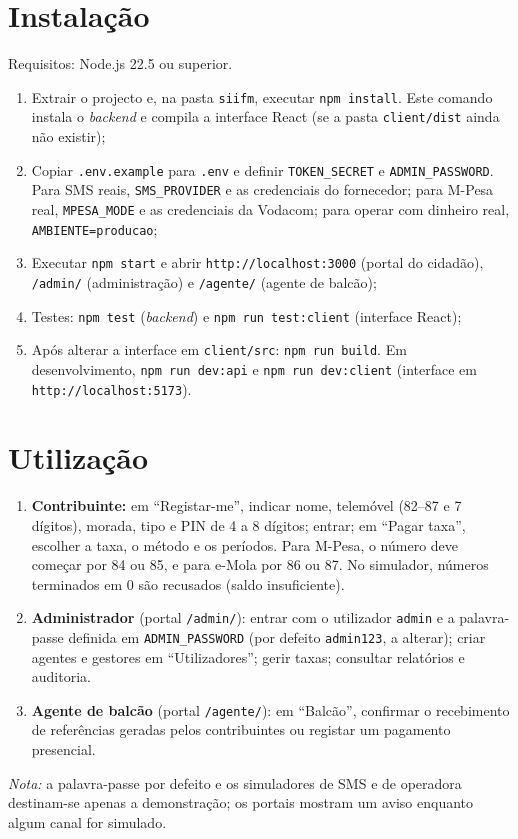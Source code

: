 \documentclass[12pt,a4paper,openany]{report}
\begin{document}
\section*{Instalação}
Requisitos: Node.js 22.5 ou superior.
\begin{enumerate}
\item Extrair o projecto e, na pasta \texttt{siifm}, executar \texttt{npm install}. Este comando instala o \emph{backend} e compila a interface React (se a pasta \texttt{client/dist} ainda não existir);
\item Copiar \texttt{.env.example} para \texttt{.env} e definir \texttt{TOKEN\_SECRET} e \texttt{ADMIN\_PASSWORD}. Para SMS reais, \texttt{SMS\_PROVIDER} e as credenciais do fornecedor; para M-Pesa real, \texttt{MPESA\_MODE} e as credenciais da Vodacom; para operar com dinheiro real, \texttt{AMBIENTE=producao};
\item Executar \texttt{npm start} e abrir \texttt{http://localhost:3000} (portal do cidadão), \texttt{/admin/} (administração) e \texttt{/agente/} (agente de balcão);
\item Testes: \texttt{npm test} (\emph{backend}) e \texttt{npm run test:client} (interface React);
\item Após alterar a interface em \texttt{client/src}: \texttt{npm run build}. Em desenvolvimento, \texttt{npm run dev:api} e \texttt{npm run dev:client} (interface em \texttt{http://localhost:5173}).
\end{enumerate}
\section*{Utilização}
\begin{enumerate}
\item \textbf{Contribuinte:} em ``Registar-me'', indicar nome, telemóvel (82--87 e 7 dígitos), morada, tipo e PIN de 4 a 8 dígitos; entrar; em ``Pagar taxa'', escolher a taxa, o método e os períodos. Para M-Pesa, o número deve começar por 84 ou 85, e para e-Mola por 86 ou 87. No simulador, números terminados em 0 são recusados (saldo insuficiente).
\item \textbf{Administrador} (portal \texttt{/admin/}): entrar com o utilizador \texttt{admin} e a palavra-passe definida em \texttt{ADMIN\_PASSWORD} (por defeito \texttt{admin123}, a alterar); criar agentes e gestores em ``Utilizadores''; gerir taxas; consultar relatórios e auditoria.
\item \textbf{Agente de balcão} (portal \texttt{/agente/}): em ``Balcão'', confirmar o recebimento de referências geradas pelos contribuintes ou registar um pagamento presencial.
\end{enumerate}
\emph{Nota:} a palavra-passe por defeito e os simuladores de SMS e de operadora destinam-se apenas a demonstração; os portais mostram um aviso enquanto algum canal for simulado.
\end{document}
